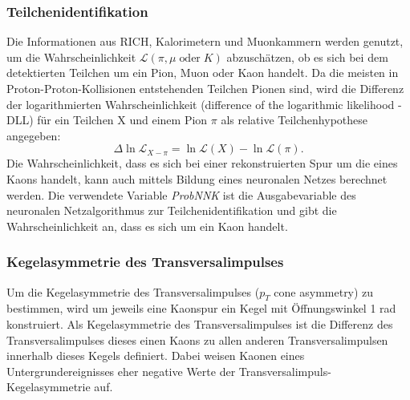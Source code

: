 \documentclass{article}
\begin{document}
\subsubsection{Teilchenidentifikation}
Die Informationen aus RICH, Kalorimetern und Muonkammern werden genutzt, um die Wahrscheinlichkeit $\mathcal{L} (\pi, \mu \; \text{oder} \; K)$ abzuschätzen, ob es sich bei dem detektierten Teilchen um ein Pion, Muon oder Kaon handelt. Da die meisten in Proton-Proton-Kollisionen entstehenden Teilchen Pionen sind, wird die Differenz der logarithmierten Wahrscheinlichkeit (difference of the logarithmic likelihood - DLL) für ein Teilchen X und einem Pion $\pi$ als relative Teilchenhypothese angegeben: \[\Delta \ln \mathcal{L}_{X-\pi}=\ln \mathcal{L}(X)-\ln \mathcal{L}(\pi).\]
Die Wahrscheinlichkeit, dass es sich bei einer rekonstruierten Spur um die eines Kaons handelt, kann auch mittels Bildung eines neuronalen Netzes berechnet werden. Die verwendete Variable \textit{ProbNNK} ist die Ausgabevariable des neuronalen Netzalgorithmus zur Teilchenidentifikation und gibt die Wahrscheinlichkeit an, dass es sich um ein Kaon handelt.

\subsubsection{Kegelasymmetrie des Transversalimpulses}
Um die Kegelasymmetrie des Transversalimpulses ($p_T$ cone asymmetry) zu bestimmen, wird um jeweils eine Kaonspur ein Kegel mit Öffnungswinkel 1 rad konstruiert. Als Kegelasymmetrie des Transversalimpulses ist die Differenz des Transversalimpulses dieses einen Kaons zu allen anderen Transversalimpulsen innerhalb dieses Kegels definiert. Dabei weisen Kaonen eines Untergrundereignisses eher negative Werte der Transversalimpuls-Kegelasymmetrie auf.

\end{document}
